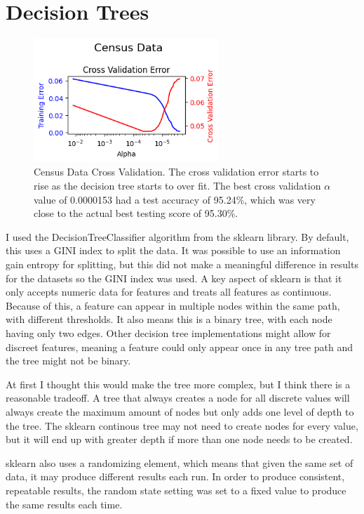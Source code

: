 \documentclass[letterpaper]{article} %
\begin{document}
\section{Decision Trees}

\begin{figure}[h]
\centering
\includegraphics[width=2.75in]{figures/Census_Data_decision_tree_cross_validation.png}
\caption{Census Data Cross Validation.  The cross validation error starts to rise as the decision tree starts to over fit.  The best cross validation $\alpha$ value of 0.0000153 had a test accuracy of 95.24\%, which was very close to the actual best testing score of 95.30\%. }
\label{fig:census_data_decision_tree_cross_validation}
\end{figure}

I used the DecisionTreeClassifier algorithm from the sklearn library.  By default, this uses a GINI index to split the data.  It was possible to use an information gain entropy for splitting, but this did not make a meaningful difference in results for the datasets so the GINI index was used.  A key aspect of sklearn is that it only accepts numeric data for features and treats all features as continuous.  Because of this, a feature can appear in multiple nodes within the same path, with different thresholds.  It also means this is a binary tree, with each node having only two edges.  Other decision tree implementations might allow for discreet features, meaning a feature could only appear once in any tree path and the tree might not be binary.  

At first I thought this would make the tree more complex, but I think there is a reasonable tradeoff.  A tree that always creates a node for all discrete values will always create the maximum amount of nodes but only adds one level of depth to the tree.  The sklearn continous tree may not need to create nodes for every value, but it will end up with greater depth if more than one node needs to be created.  

sklearn also uses a randomizing element, which means that given the same set of data, it may produce different results each run.  In order to produce consistent, repeatable results, the random state setting was set to a fixed value to produce the same results each time.
\end{document}
